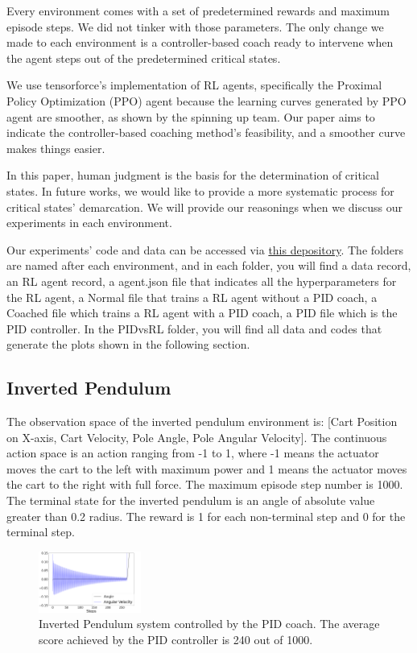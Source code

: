 \documentclass[AMS,STIX1COL]{WileyNJD-v2}
\begin{document}
Every environment comes with a set of predetermined rewards and maximum episode steps. We did not tinker with those parameters. The only change we made to each environment is a controller-based coach ready to intervene when the agent steps out of the predetermined critical states.

We use tensorforce's\citet{tensorforce} implementation of RL agents, specifically the Proximal Policy Optimization (PPO) agent because the learning curves generated by PPO agent are smoother, as shown by the spinning up\citet{SpinningUp2018} team. Our paper aims to indicate the controller-based coaching method's feasibility, and a smoother curve makes things easier. 

In this paper, human judgment is the basis for the determination of critical states. In future works, we would like to provide a more systematic process for critical states' demarcation. We will provide our reasonings when we discuss our experiments in each environment. 

Our experiments' code and data can be accessed via \href{https://github.com/BaiLiping/Coaching}{this depository}. The folders are named after each environment, and in each folder, you will find a data record, an RL agent record, a agent.json file that indicates all the hyperparameters for the RL agent, a Normal file that trains a RL agent without a PID coach, a Coached file which trains a RL agent with a PID coach, a PID file which is the PID controller. In the PIDvsRL folder, you will find all data and codes that generate the plots shown in the following section.

\subsection{Inverted Pendulum}
The observation space of the inverted pendulum environment is: [Cart Position on X-axis, Cart Velocity, Pole Angle, Pole Angular Velocity]. The continuous action space is an action ranging from -1 to 1, where -1 means the actuator moves the cart to the left with maximum power and 1 means the actuator moves the cart to the right with full force. The maximum episode step number is 1000. The terminal state for the inverted pendulum is an angle of absolute value greater than 0.2 radius. The reward is 1 for each non-terminal step and 0 for the terminal step. 


\begin{figure}
  \centering
  \includegraphics[width=0.3\textwidth]{ip_PID}
  \caption{Inverted Pendulum system controlled by the PID coach. The average score achieved by the PID controller is 240 out of 1000.}
  \label{fig:ip_pid}
\end{figure}
\end{document}
